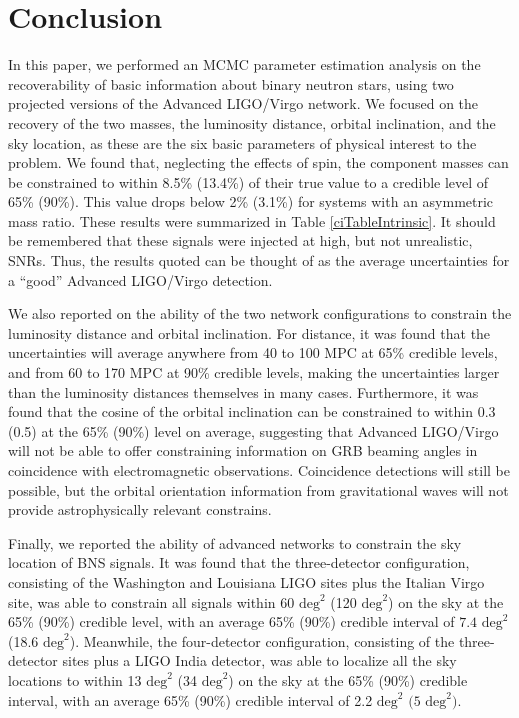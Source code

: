 \documentclass[11pt,a4paper]{emulateapj} 
\begin{document}
\section{Conclusion}
\label{conclusionSection}

In this paper, we performed an MCMC parameter estimation analysis on
the recoverability of basic information about binary neutron stars,
using two projected versions of the Advanced LIGO/Virgo network.  We
focused on the recovery of the two masses, the luminosity distance,
orbital inclination, and the sky location, as these are the six basic
parameters of physical interest to the problem.  We found that,
neglecting the effects of spin, the component masses can be
constrained to within 8.5\% (13.4\%) of their true value to a credible level of
65\% (90\%).  This value drops below 2\% (3.1\%) for systems with an asymmetric mass
ratio.  These results were summarized in Table \ref{ciTableIntrinsic}.
It should be remembered that these signals were injected at high, 
but not unrealistic, SNRs.  Thus, the results quoted can be thought of as the
average uncertainties for a ``good'' Advanced LIGO/Virgo detection.

 
We also reported on the ability of the two network configurations to
constrain the luminosity distance and orbital inclination.  For
distance, it was found that the uncertainties will average anywhere from
40 to 100 MPC at 65\% credible levels, and from 60 to 170 MPC at 90\% credible levels,
 making the uncertainties 
larger than the luminosity distances themselves in many cases.  Furthermore, it was
found that the cosine of the orbital inclination can be constrained to
within 0.3 (0.5) at the 65\% (90\%) level on average,
 suggesting that Advanced LIGO/Virgo will not
be able to offer constraining information on GRB beaming angles in coincidence
with electromagnetic observations.  Coincidence detections will still be possible, but
the orbital orientation information from gravitational waves will 
not provide astrophysically relevant constrains.


Finally, we reported the ability of advanced networks to constrain the
sky location of BNS signals.  It was found that the three-detector
configuration, consisting of the Washington and Louisiana LIGO sites
plus the Italian Virgo site, was able to constrain all signals within
60 $\mathrm{deg}^2$ (120 $\mathrm{deg}^2$) on the sky at the 65\% (90\%) credible level, with
an average 65\% (90\%) credible interval of $7.4$ $\mathrm{deg}^2$ (18.6 $\mathrm{deg}^2$).
Meanwhile, the four-detector configuration, consisting of the
three-detector sites plus a LIGO India detector, was able to localize
all the sky locations to within 13 $\mathrm{deg}^2$ (34 $\mathrm{deg}^2$) on the sky at the 65\% (90\%)
credible interval, with an average 65\% (90\%) credible interval of 
2.2 $\mathrm{deg}^2$ $(5$ $\mathrm{deg}^2)$.
\end{document}
